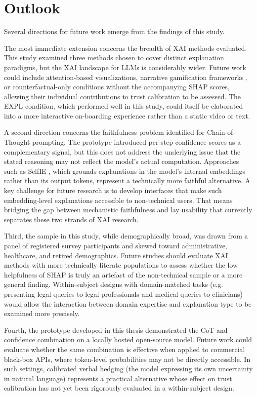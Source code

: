 \section{Outlook}

Several directions for future work emerge from the findings of this study.

The most immediate extension concerns the breadth of XAI methods evaluated. This study examined three methods chosen to cover distinct explanation paradigms, but the XAI landscape for LLMs is considerably wider. Future work could include attention-based visualizations, narrative gamification frameworks \cite{you_gamifying_2024}, or counterfactual-only conditions without the accompanying SHAP scores, allowing their individual contributions to trust calibration to be assessed. The EXPL condition, which performed well in this study, could itself be elaborated into a more interactive on-boarding experience rather than a static video or text.

A second direction concerns the faithfulness problem identified for Chain-of-Thought prompting. The prototype introduced per-step confidence scores as a complementary signal, but this does not address the underlying issue that the stated reasoning may not reflect the model's actual computation. Approaches such as SelfIE \cite{chen_selfie_2024}, which grounds explanations in the model's internal embeddings rather than its output tokens, represent a technically more faithful alternative. A key challenge for future research is to develop interfaces that make such embedding-level explanations accessible to non-technical users. That means bridging the gap between mechanistic faithfulness and lay usability that currently separates these two strands of XAI research.

Third, the sample in this study, while demographically broad, was drawn from a panel of registered survey participants and skewed toward administrative, healthcare, and retired demographics. Future studies should evaluate XAI methods with more technically literate populations to assess whether the low helpfulness of SHAP is truly an artefact of the non-technical sample or a more general finding. Within-subject designs with domain-matched tasks (e.g. presenting legal queries to legal professionals and medical queries to clinicians) would allow the interaction between domain expertise and explanation type to be examined more precisely.

Fourth, the prototype developed in this thesis demonstrated the CoT and confidence combination on a locally hosted open-source model. Future work could evaluate whether the same combination is effective when applied to commercial black-box APIs, where token-level probabilities may not be directly accessible. In such settings, calibrated verbal hedging (the model expressing its own uncertainty in natural language) represents a practical alternative whose effect on trust calibration has not yet been rigorously evaluated in a within-subject design.

